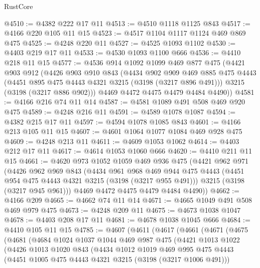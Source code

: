 \begin{lexlean}{RustCore}
\begin{coremodule}
@4510 := @4382 @222 @17 @11
@4513 := @4510 @1118 @1125 @843
@4517 := @4166 @220 @105 @11 @15
@4523 := @4517 @1104 @1117 @1124 @469 @869 @475
@4525 := @4248 @220 @11
@4527 := @4525 @1093 @1102
@4530 := @4403 @219 @17 @11
@4533 := @4530 @1093 @1100 @666
@4536 := @4410 @218 @11 @15
@4577 := @4536
    @914
    @1092
    @1099
    @469
    @877
    @475
    (@4421
      @903
      @912
      (@4426
        @903
        @910
        @843
        (@4434
          @902
          @909
          @469
          @885
          @475
          @4443
          (@4451 @895 @475 @4443 @4321 @3215 (@3198 (@3217 @896 @491)))
          @3215
          (@3198 (@3217 @886 @902)))
        @4469
        @4472
        @4475
        @4479
        @4484
        @4490))
@4581 := @4166 @216 @74 @11 @14
@4587 := @4581 @1089 @491 @508 @469 @920 @475
@4589 := @4248 @216 @11
@4591 := @4589 @1078 @1087
@4594 := @4382 @215 @17 @11
@4597 := @4594 @1078 @1085 @843
@4601 := @4166 @213 @105 @11 @15
@4607 := @4601 @1064 @1077 @1084 @469 @928 @475
@4609 := @4248 @213 @11
@4611 := @4609 @1053 @1062
@4614 := @4403 @212 @17 @11
@4617 := @4614 @1053 @1060 @666
@4620 := @4410 @211 @11 @15
@4661 := @4620
    @973
    @1052
    @1059
    @469
    @936
    @475
    (@4421
      @962
      @971
      (@4426
        @962
        @969
        @843
        (@4434
          @961
          @968
          @469
          @944
          @475
          @4443
          (@4451 @954 @475 @4443 @4321 @3215 (@3198 (@3217 @955 @491)))
          @3215
          (@3198 (@3217 @945 @961)))
        @4469
        @4472
        @4475
        @4479
        @4484
        @4490))
@4662 := @4166 @209
@4665 := @4662 @74 @11 @14
@4671 := @4665 @1049 @491 @508 @469 @979 @475
@4673 := @4248 @209 @11
@4675 := @4673 @1038 @1047
@4678 := @4403 @208 @17 @11
@4681 := @4678 @1038 @1045 @666
@4684 := @4410 @105 @11 @15
@4785 := @4607
    (@4611
      (@4617
        (@4661
          (@4671
            (@4675
              (@4681
                (@4684
                  @1024
                  @1037
                  @1044
                  @469
                  @987
                  @475
                  (@4421
                    @1013
                    @1022
                    (@4426
                      @1013
                      @1020
                      @843
                      (@4434
                        @1012
                        @1019
                        @469
                        @995
                        @475
                        @4443
                        (@4451 @1005 @475 @4443 @4321 @3215 (@3198 (@3217 @1006 @491)))

\end{coremodule}
\end{lexlean}
